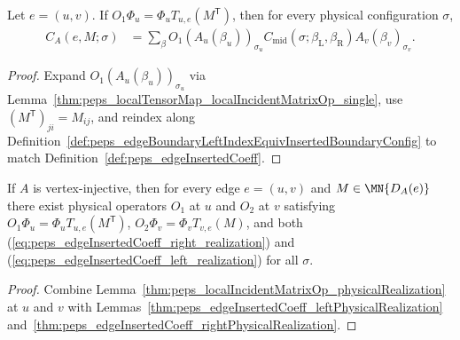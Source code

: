 \begin{lemma}%
    \label{thm:peps_edgeInsertedCoeff_leftPhysicalRealization}
    \leanok
    Let $e=(u,v)$. If $O_1\Phi_u=\Phi_uT_{u,e}(M^{\mathsf T})$, then for every
    physical configuration $\sigma$,
    \begin{align}
        C_A(e,M;\sigma)
         & =\sum_{\beta} O_1(A_u(\beta_u))_{\sigma_u}
        C_{\mathrm{mid}}(\sigma;\beta_{\mathrm{L}},\beta_{\mathrm{R}})
        A_v(\beta_v)_{\sigma_v}.
        \label{eq:peps_edgeInsertedCoeff_left_realization}
    \end{align}
\end{lemma}
\begin{proof}\leanok
    Expand $O_1(A_u(\beta_u))_{\sigma_u}$ via
    Lemma~\ref{thm:peps_localTensorMap_localIncidentMatrixOp_single}, use
    $(M^{\mathsf T})_{ji}=M_{ij}$, and reindex along
    Definition~\ref{def:peps_edgeBoundaryLeftIndexEquivInsertedBoundaryConfig}
    to match Definition~\ref{def:peps_edgeInsertedCoeff}.
\end{proof}

\begin{lemma}%
    \label{thm:peps_edgeInsertedCoeff_endpointPhysicalRealization}
    \leanok
    If $A$ is vertex-injective, then for every edge $e=(u,v)$ and
    $M\in\MN{D_A(e)}$ there exist physical operators $O_1$ at $u$ and $O_2$ at
    $v$ satisfying $O_1\Phi_u=\Phi_uT_{u,e}(M^{\mathsf T})$,
    $O_2\Phi_v=\Phi_vT_{v,e}(M)$, and both
    (\ref{eq:peps_edgeInsertedCoeff_right_realization}) and
    (\ref{eq:peps_edgeInsertedCoeff_left_realization}) for all $\sigma$.
\end{lemma}
\begin{proof}\leanok
    Combine Lemma~\ref{thm:peps_localIncidentMatrixOp_physicalRealization} at
    $u$ and $v$ with Lemmas~\ref{thm:peps_edgeInsertedCoeff_leftPhysicalRealization}
    and~\ref{thm:peps_edgeInsertedCoeff_rightPhysicalRealization}.
\end{proof}

